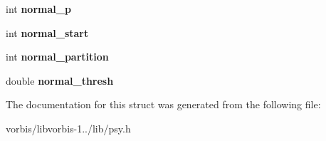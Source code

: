 \begin{DoxyCompactItemize}
\item 
\hypertarget{structvorbis__info__psy_ae6765718469a8efa31817f451996951f}{int {\bfseries normal\+\_\+p}}\label{structvorbis__info__psy_ae6765718469a8efa31817f451996951f}

\item 
\hypertarget{structvorbis__info__psy_a04680a3cb4a277fa8534e23d62e8939b}{int {\bfseries normal\+\_\+start}}\label{structvorbis__info__psy_a04680a3cb4a277fa8534e23d62e8939b}

\item 
\hypertarget{structvorbis__info__psy_a96b80a288323a1ce2fc2e9f65d48c5b1}{int {\bfseries normal\+\_\+partition}}\label{structvorbis__info__psy_a96b80a288323a1ce2fc2e9f65d48c5b1}

\item 
\hypertarget{structvorbis__info__psy_ac733f35b4ca08d41b3de512e903e3ae0}{double {\bfseries normal\+\_\+thresh}}\label{structvorbis__info__psy_ac733f35b4ca08d41b3de512e903e3ae0}

\end{DoxyCompactItemize}


The documentation for this struct was generated from the following file\+:\begin{DoxyCompactItemize}
\item 
vorbis/libvorbis-\/1../lib/psy.\+h\end{DoxyCompactItemize}
